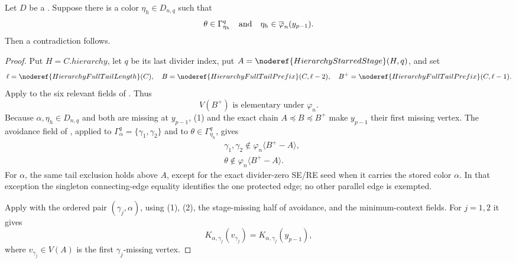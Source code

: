 \begin{lemma}
Let \(D\) be a .  Suppose
there is a color \(\eta_h\in D_{n,q}\) such that
\[
       \theta\in\Gamma^q_{\eta_h}
       \quad\hbox{and}\quad
       \eta_h\in\overline\varphi_n(y_{p-1}).
\]
Then a contradiction follows.
\end{lemma}
\begin{proof}
Put \(H=C.\mathit{hierarchy}\), let \(q\) be its last divider index,
put \(A=\noderef{HierarchyStarredStage}(H,q)\), and set
\[
 \ell=\noderef{HierarchyFullTailLength}(C),\quad
 B=\noderef{HierarchyFullTailPrefix}(C,\ell-2),\quad
 B^+=\noderef{HierarchyFullTailPrefix}(C,\ell-1).
\]
Apply  to the
six relevant fields of
.  Thus
\[
                  V(B^+)\text{ is elementary under }\varphi_n.       \tag{1}
\]
Because \(\alpha,\eta_h\in D_{n,q}\) and both are missing at
\(y_{p-1}\), (1) and the exact chain \(A\preccurlyeq B\preccurlyeq
B^+\) make \(y_{p-1}\) their first missing vertex.  The avoidance
field of , applied to
\(\Gamma^q_\alpha=\{\gamma_1,\gamma_2\}\) and to
\(\theta\in\Gamma^q_{\eta_h}\), gives
\[
 \begin{aligned}
 &\gamma_1,\gamma_2\notin
       \varphi_n\langle B^+-A\rangle,\\
 &\theta\notin\varphi_n\langle B^+-A\rangle.                 \tag{2}
 \end{aligned}
\]
For \(\alpha\), the same tail exclusion holds above \(A\), except for
the exact divider-zero SE/RE seed when it carries the stored color
\(\alpha\).  In that exception the singleton connecting-edge equality
identifies the one protected edge; no other parallel edge is exempted.

Apply  with the ordered pair
\((\gamma_j,\alpha)\), using (1), (2), the stage-missing half of
avoidance, and the minimum-context fields.  For \(j=1,2\) it gives
\[
 K_{\alpha,\gamma_j}(v_{\gamma_j})
      =K_{\alpha,\gamma_j}(y_{p-1}),                          \tag{3}
\]
where \(v_{\gamma_j}\in V(A)\) is the first
\(\gamma_j\)-missing vertex.


\end{proof}
